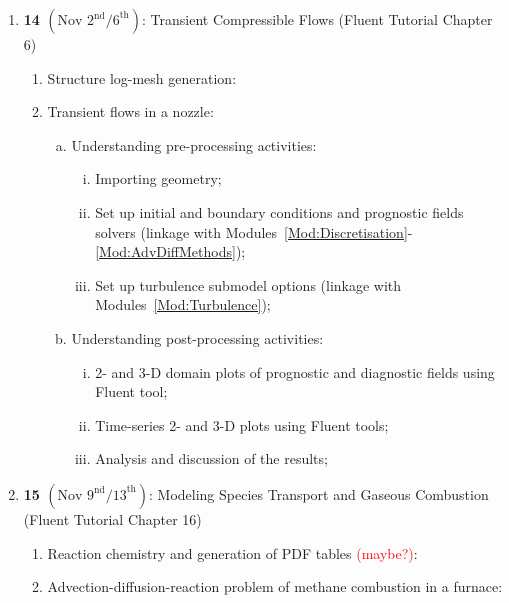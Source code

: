 \documentclass[12pts,a4paper,amsmath,amssymb,floatfix]{article}%
\begin{document}
\begin{enumerate}[{\bf Week}]
\begin{enumerate}[1]
\begin{enumerate}[(a)]
             \end{enumerate} 
      \end{enumerate}
%
   \item {\bf 14 $\left(\text{Nov 2}^{\text{nd}}\text{/6}^{\text{th}}\right)$}: Transient Compressible Flows (Fluent Tutorial Chapter 6)
      \begin{enumerate}[1]
         \item Structure log-mesh generation:
         \item Transient flows in a nozzle:
             \begin{enumerate}[(a)]
                \item Understanding pre-processing activities: 
                   \begin{enumerate}[(i)]
                      \item Importing geometry;
                      \item Set up initial and boundary conditions and prognostic fields solvers (linkage with Modules~\ref{Mod:Discretisation}-\ref{Mod:AdvDiffMethods});
                      \item Set up turbulence submodel options (linkage with Modules~\ref{Mod:Turbulence});
                   \end{enumerate}
                \item Understanding post-processing activities:  
                   \begin{enumerate}[(i)]
                      \item 2- and 3-D domain plots of prognostic and diagnostic fields using Fluent tool;
                      \item Time-series 2- and 3-D plots using Fluent tools;
                      \item Analysis and discussion of the results;
                   \end{enumerate}
             \end{enumerate} 
      \end{enumerate}
%
   \item {\bf 15 $\left(\text{Nov 9}^{\text{nd}}\text{/13}^{\text{th}}\right)$}: Modeling Species Transport and Gaseous Combustion (Fluent Tutorial Chapter 16)
      \begin{enumerate}[1]
         \item Reaction chemistry and generation of PDF tables \textcolor{red}{(maybe?)}:
         \item Advection-diffusion-reaction problem of methane combustion in a furnace:

\end{enumerate}
\end{enumerate}
\end{document}
